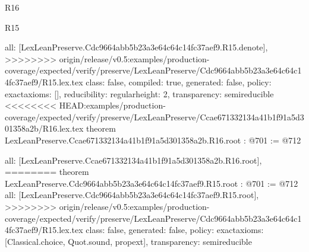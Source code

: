 \begin{lexlean}{R16}
\begin{lexlean}{R15}
\begin{coremodule}
{{{{{  all: [LexLeanPreserve.Cdc9664abb5b23a3e64c64c14fc37aef9.R15.denote],
>>>>>>>> origin/release/v0.5:examples/production-coverage/expected/verify/preserve/LexLeanPreserve/Cdc9664abb5b23a3e64c64c14fc37aef9/R15.lex.tex
  class: false,
  compiled: true,
  generated: false,
  policy: exact{axioms: []},
  reducibility: regular{height: 2},
  transparency: semireducible
}
<<<<<<<< HEAD:examples/production-coverage/expected/verify/preserve/LexLeanPreserve/Ccae671332134a41b1f91a5d301358a2b/R16.lex.tex
theorem LexLeanPreserve.Ccae671332134a41b1f91a5d301358a2b.R16.root : @701 := @712 {
  all: [LexLeanPreserve.Ccae671332134a41b1f91a5d301358a2b.R16.root],
========
theorem LexLeanPreserve.Cdc9664abb5b23a3e64c64c14fc37aef9.R15.root : @701 := @712 {
  all: [LexLeanPreserve.Cdc9664abb5b23a3e64c64c14fc37aef9.R15.root],
>>>>>>>> origin/release/v0.5:examples/production-coverage/expected/verify/preserve/LexLeanPreserve/Cdc9664abb5b23a3e64c64c14fc37aef9/R15.lex.tex
  class: false,
  generated: false,
  policy: exact{axioms: [Classical.choice, Quot.sound, propext]},
  transparency: semireducible
}

}}}}}
\end{coremodule}
\end{lexlean}
\end{lexlean}
